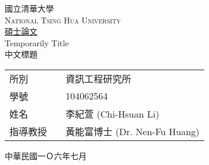 \begin{center}
{\fontsize{32}{36}\selectfont 國立清華大學} \\
\large{\scshape National Tsing Hua University} \\
\vspace*{6ex}
\underline{\LARGE 碩士論文} \\

\null
\vfill
\Huge Temporarily Title\\
\vspace*{6ex}
\LARGE
中文標題 \\

\null
\vfill

\large
\begin{tabular}{ll}
所別~~~     &資訊工程研究所                    \\[2ex]
學號~~~     &104062564                       \\[2ex]
姓名~~~     &李紀萱 (Chi-Hsuan Li)            \\[2ex]
指導教授~~  &黃能富博士 (Dr. Nen-Fu Huang)      \\[2ex]
\end{tabular}

\vspace*{6ex}
\Large 中華民國一Ｏ六年七月
\end{center}
